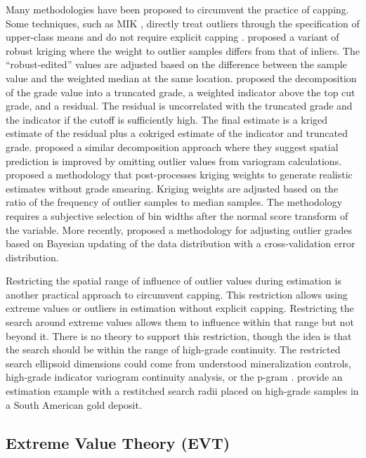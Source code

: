 Many methodologies have been proposed to circumvent the practice of capping. Some techniques, such as \gls{MIK} \citep{journel1983nonparametric}, directly treat outliers through the specification of upper-class means and do not require explicit capping \citep{rossi2013mineral}. \cite{costa2003reducing} proposed a variant of robust kriging \citep{hawkins1984robust} where the weight to outlier samples differs from that of inliers. The ``robust-edited'' values are adjusted based on the difference between the sample value and the weighted median at the same location. \cite{rivoirard2013topcut} proposed the decomposition of the grade value into a truncated grade, a weighted indicator above the top cut grade, and a residual. The residual is uncorrelated with the truncated grade and the indicator if the cutoff is sufficiently high. The final estimate is a kriged estimate of the residual plus a cokriged estimate of the indicator and truncated grade. \cite{maleki2014capping} proposed a similar decomposition approach where they suggest spatial prediction is improved by omitting outlier values from variogram calculations. \cite{fourie2019limiting} proposed a methodology that post-processes kriging weights to generate realistic estimates without grade smearing. Kriging weights are adjusted based on the ratio of the frequency of outlier samples to median samples. The methodology requires a subjective selection of bin widths after the normal score transform of the variable. More recently, \cite{silva2021classification} proposed a methodology for adjusting outlier grades based on Bayesian updating of the data distribution with a cross-validation error distribution.

Restricting the spatial range of influence of outlier values during estimation is another practical approach to circumvent capping. This restriction allows using extreme values or outliers in estimation without explicit capping. Restricting the search around extreme values allows them to influence within that range but not beyond it. There is no theory to support this restriction, though the idea is that the search should be within the range of high-grade continuity. The restricted search ellipsoid dimensions could come from understood mineralization controls, high-grade indicator variogram continuity analysis, or the p-gram \citep{leuangthong2015dealing}. \cite{leuangthong2015dealing} provide an estimation example with a restitched search radii placed on high-grade samples in a South American gold deposit.

\subsection{Extreme Value Theory (EVT)}
\label{subsec:01evt}

